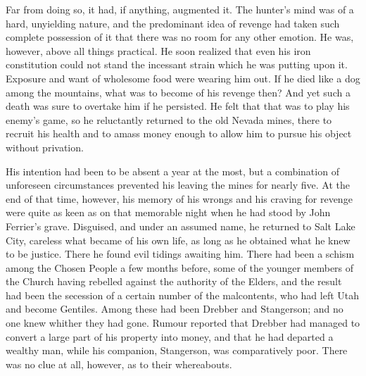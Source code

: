 Far from doing so, it had, if anything, augmented it. The hunter's mind was of a hard, unyielding nature, and the predominant idea of revenge had taken such complete possession of it that there was no room for any other emotion. He was, however, above all things practical. He soon realized that even his iron constitution could not stand the incessant strain which he was putting upon it. Exposure and want of wholesome food were wearing him out. If he died like a dog among the mountains, what was to become of his revenge then? And yet such a death was sure to overtake him if he persisted. He felt that that was to play his enemy's game, so he reluctantly returned to the old Nevada mines, there to recruit his health and to amass money enough to allow him to pursue his object without privation.

His intention had been to be absent a year at the most, but a combination of unforeseen circumstances prevented his leaving the mines for nearly five. At the end of that time, however, his memory of his wrongs and his craving for revenge were quite as keen as on that memorable night when he had stood by John Ferrier's grave. Disguised, and under an assumed name, he returned to Salt Lake City, careless what became of his own life, as long as he obtained what he knew to be justice. There he found evil tidings awaiting him. There had been a schism among the Chosen People a few months before, some of the younger members of the Church having rebelled against the authority of the Elders, and the result had been the secession of a certain number of the malcontents, who had left Utah and become Gentiles. Among these had been Drebber and Stangerson; and no one knew whither they had gone. Rumour reported that Drebber had managed to convert a large part of his property into money, and that he had departed a wealthy man, while his companion, Stangerson, was comparatively poor. There was no clue at all, however, as to their whereabouts.

